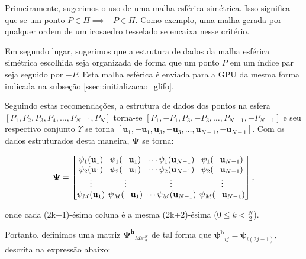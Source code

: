 \documentclass[
    12pt,                %
    oneside,            %
    a4paper,            %
    english,            %
    french,                %
    spanish,            %
    brazil                %
    ]{abntex2}
\begin{document}
Primeiramente, sugerimos o uso de uma malha esférica simétrica. Isso significa que se um ponto $P \in \Pi \implies -P \in \Pi$. Como exemplo, uma malha gerada por qualquer ordem de um icosaedro tesselado se encaixa nesse critério.

Em segundo lugar, sugerimos que a estrutura de dados da malha esférica simétrica escolhida seja organizada de forma que um ponto $P$ em um índice par seja seguido por $-P$. Esta malha esférica é enviada para a GPU da mesma forma indicada na subseção \ref{ssec::initializacao_glifo}.

Seguindo estas recomendações, a estrutura de dados dos pontos na esfera $[P_1, P_2, P_3, P_4, \dots, P_ {N-1}, P_N] $ torna-se $[P_1, -P_1, P_3, -P_3, \dots , P_ {N-1}, -P_ {N-1}]$ e seu respectivo conjunto $ \Upsilon$ se torna $[\mathbf{u}_1, - \mathbf{u}_1, \mathbf{u}_3, -\mathbf{u}_3, \dots, \mathbf{u}_{N-1}, - \mathbf{u}_{N-1}]$. Com os dados estruturados desta maneira, $\mathbf{\Psi}$ se torna:

\begin{equation}
\mathbf{\Psi} = 
\begingroup %
\setlength\arraycolsep{2pt}
\begin{bmatrix} 
    \psi_1(\mathbf{u}_1) & \psi_1(-\mathbf{u}_1) & \cdots \psi_1(\mathbf{u}_{N-1}) & \psi_1(-\mathbf{u}_{N-1})  \\
    
     \psi_2(\mathbf{u}_1)& \psi_2(-\mathbf{u}_1) & \cdots \psi_2(\mathbf{u}_{N-1}) & \psi_2(-\mathbf{u}_{N-1}) \\

    \vdots & \vdots & \vdots & \vdots  \\
    
     \psi_M(\mathbf{u}_1)&\psi_M(-\mathbf{u}_1) & \cdots \psi_M(\mathbf{u}_{N-1}) & \psi_M(-\mathbf{u}_{N-1})
    
\end{bmatrix},
\endgroup
\end{equation}

onde cada (2k+1)-ésima coluna é a mesma (2k+2)-ésima ($0 \leq k < \frac{N}{2}$).

Portanto, definimos uma matriz $\mathbf{\Psi^h}_{Mx\frac{N}{2}}$ de tal forma que $\mathbf{\psi^h}_{ij} = \mathbf{\psi}_{i(2j-1)}$, descrita na expressão abaixo:
\end{document}
